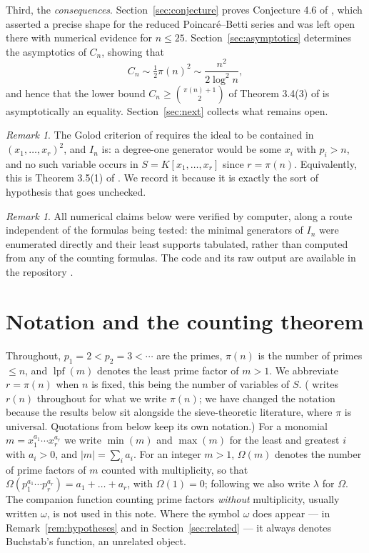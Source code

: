 \documentclass[a4paper,11pt,oneside,reqno]{amsart}
\theoremstyle{definition}
\theoremstyle{remark}
\newtheorem{remark}[definition]{Remark}
\theoremstyle{plain}
\newcommand{\lpf}{\operatorname{lpf}}
\newcommand{\Om}{\Omega}
\begin{document}
Third, the \emph{consequences}. Section~\ref{sec:conjecture} proves Conjecture
4.6 of \cite{Snellman2000}, which asserted a precise shape for the reduced
Poincaré--Betti series and was left open there with numerical evidence for
\(n \le 25\). Section~\ref{sec:asymptotics} determines the asymptotics of
\(C_n\), showing that
\[
  C_n \sim \tfrac{1}{2}\pi(n)^{2} \sim \frac{n^{2}}{2\log^{2}n},
\]
and hence that the lower bound \(C_n \ge \binom{\pi(n)+1}{2}\) of Theorem 3.4(3) of
\cite{Snellman2000} is asymptotically an equality. Section~\ref{sec:next}
collects what remains open.

\begin{remark}\label{rem:m2}
  The Golod criterion of \cite{AramovaHerzog,Peeva} requires the ideal to be
  contained in \((x_1,\dots,x_r)^{2}\), and \(I_n\) is: a degree-one
  generator would be some \(x_i\) with \(p_i > n\), and no such variable occurs
  in \(S = K[x_1,\dots,x_r]\) since \(r = \pi(n)\). Equivalently, this is Theorem
  3.5(1) of \cite{Snellman2000}. We record it because it is exactly the sort of
  hypothesis that goes unchecked.
\end{remark}

\begin{remark}
  All numerical claims below were verified by computer, along a route
  independent of the formulas being tested: the minimal generators of \(I_n\)
  were enumerated directly and their least supports tabulated, rather than
  computed from any of the counting formulas. The code and its raw output are
  available in the repository \cite{gitrepo}.
\end{remark}

\section{Notation and the counting theorem}\label{sec:prelim}

Throughout, \(p_1 = 2 < p_2 = 3 < \cdots\) are the primes, \(\pi(n)\) is the number of
primes \(\le n\), and \(\lpf(m)\) denotes the least prime factor of \(m > 1\).
We abbreviate \(r = \pi(n)\) when \(n\) is fixed, this being the number of
variables of \(S\). (\cite{Snellman2000} writes \(r(n)\) throughout for what we
write \(\pi(n)\); we have changed the notation because the results below sit
alongside the sieve-theoretic literature, where \(\pi\) is universal. Quotations
from \cite{Snellman2000} below keep its own notation.)
For a monomial \(m = x_1^{a_1}\cdots x_r^{a_r}\) we write \(\min(m)\) and
\(\max(m)\) for the least and greatest \(i\) with \(a_i > 0\), and
\(|m|=\sum_i a_i\). For an integer \(m > 1\), \(\Om(m)\) denotes the number of
prime factors of \(m\) counted with multiplicity, so that
\(\Om(p_1^{a_1}\cdots p_r^{a_r}) = a_1+\dots+a_r\), with \(\Om(1) = 0\); following
\cite{Snellman2000} we also write \(\lambda\) for \(\Om\). The companion
function counting prime factors \emph{without} multiplicity, usually written
\(\omega\), is not used in this note. Where the symbol \(\omega\) does appear
--- in Remark~\ref{rem:hypotheses} and in Section~\ref{sec:related} --- it
always denotes Buchstab's function, an unrelated object.
\end{document}
